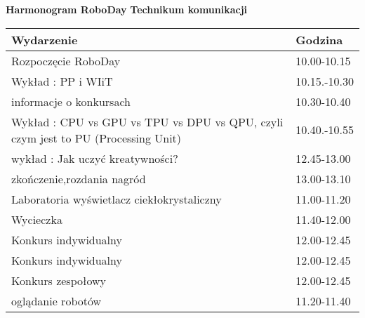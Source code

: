 \documentclass{article}
\begin{document}
\begin{center}
\Large\textbf{Harmonogram RoboDay}
\large\textbf{Technikum komunikacji}
\end{center}
\vspace{1cm}
\begin{center}
\begin{tabular}{|l|l|}
\hline
\textbf{Wydarzenie} & \textbf{Godzina} \\
\hline
Rozpoczęcie RoboDay & 10.00-10.15 \\
\hline
Wykład : PP i WIiT & 10.15.-10.30 \\
\hline
informacje o konkursach & 10.30-10.40 \\
\hline
Wykład : CPU vs GPU vs TPU vs DPU vs QPU, czyli czym jest to PU (Processing Unit) & 10.40.-10.55 \\
\hline
wykład : Jak uczyć kreatywności? & 12.45-13.00 \\
\hline
zkończenie,rozdania nagród & 13.00-13.10 \\
\hline
Laboratoria wyświetlacz ciekłokrystaliczny & 11.00-11.20 \\
\hline
Wycieczka & 11.40-12.00 \\
\hline
Konkurs indywidualny & 12.00-12.45 \\
\hline
Konkurs indywidualny & 12.00-12.45 \\
\hline
Konkurs zespołowy & 12.00-12.45 \\
\hline
oglądanie robotów & 11.20-11.40 \\
\hline
\end{tabular}
\end{center}
\end{document}
